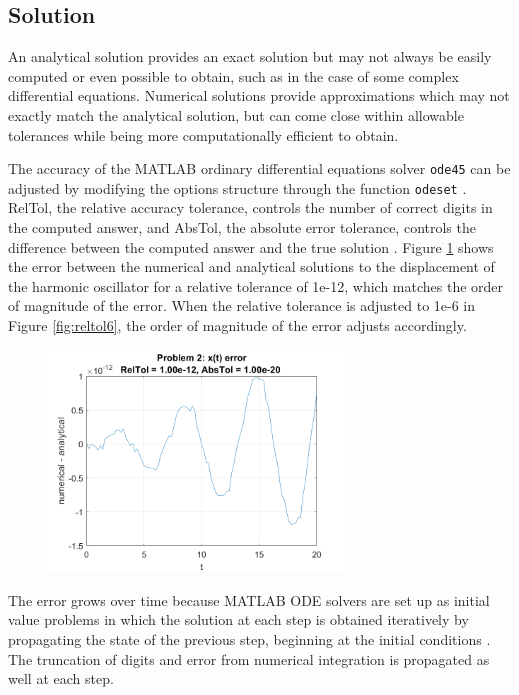 \documentclass[conf]{new-aiaa}
\begin{document}
\subsection{Solution} 

An analytical solution provides an exact solution but may not always be easily computed or even possible to obtain, such as in the case of some complex differential equations. Numerical solutions provide approximations which may not exactly match the analytical solution, but can come close within allowable tolerances while being more computationally efficient to obtain. 

The accuracy of the MATLAB ordinary differential equations solver \texttt{ode45} can be adjusted by modifying the options structure through the function \texttt{odeset} \cite{ode45}. RelTol, the relative accuracy tolerance, controls the number of correct digits in the computed answer, and AbsTol, the absolute error tolerance, controls the difference between the computed answer and the true solution \cite{odeset}. Figure \ref{fig:reltol12} shows the error between the numerical and analytical solutions to the displacement of the harmonic oscillator for a relative tolerance of 1e-12, which matches the order of magnitude of the error. When the relative tolerance is adjusted to 1e-6 in Figure \ref{fig:reltol6}, the order of magnitude of the error adjusts accordingly. 

\begin{figure}[H]
	\centering
	\includegraphics[width=0.7\textwidth]{prob2_err_reltol12.png}
	\caption{}
	\label{fig:reltol12}
\end{figure}

The error grows over time because MATLAB ODE solvers are set up as initial value problems in which the solution at each step is obtained iteratively by propagating the state of the previous step, beginning at the initial conditions \cite{choose_ode}. The truncation of digits and error from numerical integration is propagated as well at each step. 
\end{document}
